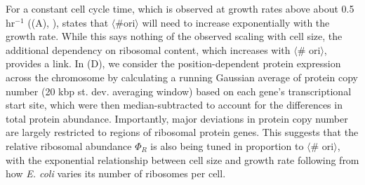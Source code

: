 For a constant cell cycle time, which is observed at growth rates above about
0.5 hr$^{-1}$ ((A), \citep{helmstetter1968}),
 states that $\langle \text{\# ori} \rangle$ will need to increase
exponentially with the growth rate. While this says nothing of the observed
scaling with cell size, the additional dependency on ribosomal content, which
increases with $\langle$\# ori$\rangle$, provides a link. In
(D), we consider the position-dependent protein
expression across the chromosome by calculating a running Gaussian average of
protein copy number (20 kbp st. dev. averaging window) based on each gene's
transcriptional start site, which were then median-subtracted to account for the
differences in total protein abundance. Importantly, major deviations in protein
copy number are largely restricted to regions of ribosomal protein genes. This
suggests that the relative ribosomal abundance $\Phi_R$ is also being tuned in
proportion to $\langle$\# ori$\rangle$, with the exponential relationship
between  cell size and growth rate following from how \textit{E. coli} varies
its number of ribosomes per cell.

